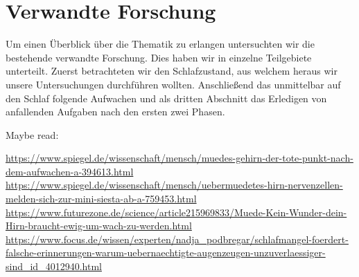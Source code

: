 \chapter{Verwandte Forschung}\label{sec:relatedWork}
Um einen Überblick über die Thematik zu erlangen untersuchten wir die bestehende verwandte Forschung. Dies haben wir in einzelne Teilgebiete unterteilt. Zuerst betrachteten wir den Schlafzustand, aus welchem heraus wir unsere Untersuchungen durchführen wollten. Anschließend das unmittelbar auf den Schlaf folgende Aufwachen und als dritten Abschnitt das Erledigen von anfallenden Aufgaben nach den ersten zwei Phasen.

Maybe read:

\url{https://www.spiegel.de/wissenschaft/mensch/muedes-gehirn-der-tote-punkt-nach-dem-aufwachen-a-394613.html}
\url{https://www.spiegel.de/wissenschaft/mensch/uebermuedetes-hirn-nervenzellen-melden-sich-zur-mini-siesta-ab-a-759453.html}
\url{https://www.futurezone.de/science/article215969833/Muede-Kein-Wunder-dein-Hirn-braucht-ewig-um-wach-zu-werden.html}
\url{https://www.focus.de/wissen/experten/nadja_podbregar/schlafmangel-foerdert-falsche-erinnerungen-warum-uebernaechtigte-augenzeugen-unzuverlaessiger-sind_id_4012940.html}
